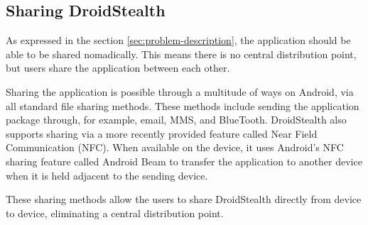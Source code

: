 \subsection{Sharing DroidStealth}
As expressed in the section \ref{sec:problem-description}, the application should be able to be shared nomadically.
This means there is no central distribution point, but users share the application between each other. 

Sharing the application is possible through a multitude of ways on Android, via all standard file sharing methods.
These methods include sending the application package through, for example, email, MMS, and BlueTooth.
DroidStealth also supports sharing via a more recently provided feature called Near Field Communication (NFC)\cite{website:nfc-spec}. 
When available on the device, it uses Android's NFC sharing feature called Android Beam to transfer the application to another device when it is held adjacent to the sending device.

These sharing methods allow the users to share DroidStealth directly from device to device, eliminating a central distribution point.
